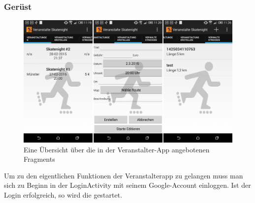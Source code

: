 \subsubsection{Gerüst}
\begin{figure}[htb]
\centering
\includegraphics[width=\textwidth]{graphics/veranstalterapp_events.png}
\caption{Eine Übersicht über die in der Veranstalter-App angebotenen Fragments}
\label{fig:veranstalterapp_fragments}
\end{figure}

Um zu den eigentlichen Funktionen der Veranstalterapp zu gelangen muss man sich zu Beginn in der LoginActivity mit seinem Google-Account einloggen. Ist der Login erfolgreich, so wird die  gestartet.

